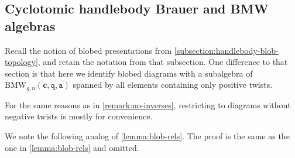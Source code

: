 \documentclass[a4paper,11pt]{amsart}
\newcommand{\setstuff}[1]{\mathrm{#1}}
\newcommand{\bsym}[1]{\boldsymbol{#1}}
\newcommand{\varsym}[1]{\mathtt{#1}}
\newcommand{\qvar}{\varsym{q}}
\newcommand{\cpar}{\bsym{c}}
\newcommand{\avar}{\varsym{a}}
\numberwithin{equation}{section}
\let\fullref\autoref
\begin{document}
\subsection{Cyclotomic handlebody Brauer and BMW algebras}\label{subsection:cbrauer}

Recall the notion of blobed presentations from 
\fullref{subsection:handlebody-blob-topology}, and retain 
the notation from that subsection.
One difference to that section is that 
here we identify blobed diagrams with a subalgebra 
of $\setstuff{BMW}_{g,n}(\cpar,\qvar,\avar)$ 
spanned by all elements containing only positive twists.

\begin{remark}
For the same reasons as in \fullref{remark:no-inverses}, restricting to 
diagrams without negative twists is mostly for convenience.
\end{remark}

We note the following analog of \fullref{lemma:blob-rels}. The proof 
is the same as the one in \fullref{lemma:blob-rels} and omitted.
\end{document}
